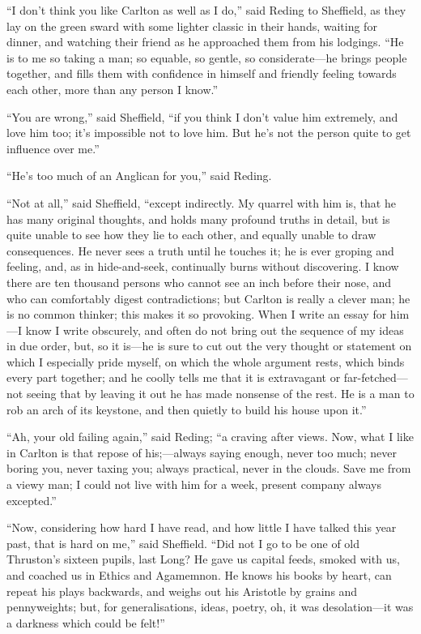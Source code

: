 ``I don't think you like Carlton as well as I do,'' said
Reding to Sheffield, as they lay on the green sward with some lighter
classic in their hands, waiting for dinner, and watching their friend
as he approached them from his lodgings. ``He is to me so taking a
man; so equable, so gentle, so considerate—he brings people
together, and fills them with confidence in himself and friendly
feeling towards each other, more than any person I know.''

``You are wrong,'' said Sheffield, ``if you think I don't
value him extremely, and love him too; it's impossible not to love
him. But he's not the person quite to get influence over me.''

``He's too much of an Anglican for you,'' said Reding.

``Not at all,'' said Sheffield, ``except indirectly. My
quarrel with him is, that he has many original thoughts, and holds
many profound truths in detail, but is quite unable to see how they
lie to each other, and equally unable to draw consequences. He never
sees a truth until he touches it; he is ever groping and feeling, and,
as in hide-and-seek, continually burns without discovering. I know
there are ten thousand persons who cannot see an inch before their
nose, and who can comfortably digest contradictions; but Carlton is
really a clever man; he is no common thinker; this makes it so
provoking. When I write an essay for him—I know I write obscurely,
and often do not bring out the sequence of my ideas in due
order, but, so it is—he is sure to cut out the very thought or
statement on which I especially pride myself, on which the whole
argument rests, which binds every part together; and he coolly tells
me that it is extravagant or far-fetched—not seeing that by leaving
it out he has made nonsense of the rest. He is a man to rob an arch of
its keystone, and then quietly to build his house upon it.''

``Ah, your old failing again,'' said Reding; ``a
craving after views. Now, what I like in Carlton is that repose of
his;—always saying enough, never too much; never boring you, never
taxing you; always practical, never in the clouds. Save me from a
viewy man; I could not live with him for a week, present company
always excepted.''

``Now, considering how hard I have read, and how little I have
talked this year past, that is hard on me,'' said Sheffield.
``Did not I go to be one of old Thruston's sixteen pupils, last
Long? He gave us capital feeds, smoked with us, and coached us in
Ethics and Agamemnon. He knows his books by heart, can repeat his
plays backwards, and weighs out his Aristotle by grains and
pennyweights; but, for generalisations, ideas, poetry, oh, it was
desolation—it was a darkness which could be felt!''

